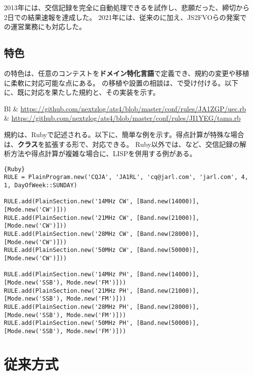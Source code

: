 \documentclass[10pt,a4paper]{book}
\begin{document}
2013年には、交信記録を完全に自動処理できるを試作し、悲願だった、締切から2日での結果速報を達成した。
2021年には、従来の\ja{}に加え、JS2FVOらの発案で\rt{}の運営業務にも対応した。

\section{特色}

の特色は、任意のコンテストを\textbf{ドメイン特化言語}で定義でき、規約の変更や移植に柔軟に対応可能な点にある。
の移植や設置の相談は、\todo{}で受け付ける。以下に、既に対応を果たした規約と、その実装を示す。

\begin{table}[H]
\raggedright
\begin{tabular}{Bl}
\ue{} & \url{https://github.com/nextzlog/ats4/blob/master/conf/rules/JA1ZGP/uec.rb} \\
\ta{} & \url{https://github.com/nextzlog/ats4/blob/master/conf/rules/JI1YEG/tama.rb} \\
\end{tabular}
\end{table}

規約は、Rubyで記述される。以下に、簡単な例を示す。得点計算が特殊な場合は、\textbf{クラス}を拡張する形で、対応できる。
Ruby以外では、\ja{}など、交信記録の解析方法や得点計算が複雑な場合に、LISPを併用する例がある。

\begin{Verbatim}{Ruby}
RULE = PlainProgram.new('CQJA', 'JA1RL', 'cq@jarl.com', 'jarl.com', 4, 1, DayOfWeek::SUNDAY)

RULE.add(PlainSection.new('14MHz CW', [Band.new(14000)], [Mode.new('CW')]))
RULE.add(PlainSection.new('21MHz CW', [Band.new(21000)], [Mode.new('CW')]))
RULE.add(PlainSection.new('28MHz CW', [Band.new(28000)], [Mode.new('CW')]))
RULE.add(PlainSection.new('50MHz CW', [Band.new(50000)], [Mode.new('CW')]))

RULE.add(PlainSection.new('14MHz PH', [Band.new(14000)], [Mode.new('SSB'), Mode.new('FM')]))
RULE.add(PlainSection.new('21MHz PH', [Band.new(21000)], [Mode.new('SSB'), Mode.new('FM')]))
RULE.add(PlainSection.new('28MHz PH', [Band.new(28000)], [Mode.new('SSB'), Mode.new('FM')]))
RULE.add(PlainSection.new('50MHz PH', [Band.new(50000)], [Mode.new('SSB'), Mode.new('FM')]))
\end{Verbatim}

\chapter{従来方式\label{chap:mail}}
\end{document}
